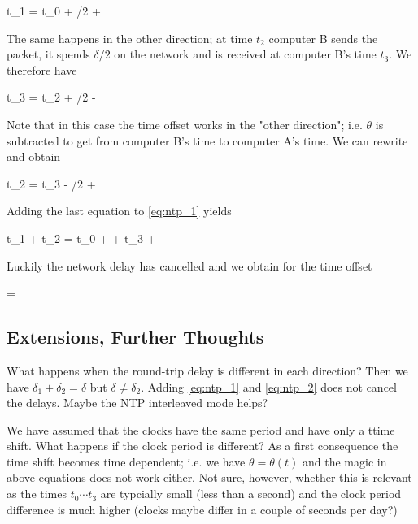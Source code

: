 \be\label{eq:ntp_1}
t_1 = t_0 + \delta/2 + \theta
\ee

The same happens in the other direction; at time $t_2$ computer B sends the packet, it spends $\delta/2$ on the network and is received at computer B's time $t_3$. We therefore have

\bee
t_3 = t_2 + \delta/2 - \theta
\eee

Note that in this case the time offset works in the "other direction"; i.e. $\theta$ is subtracted to get from computer B's time to computer A's time. We can rewrite and obtain

\be\label{eq:ntp_2}
t_2 = t_3 - \delta/2 + \theta
\ee

Adding the last equation to \eqref{eq:ntp_1} yields

\bee
t_1 + t_2 = t_0 + \theta + t_3 + \theta
\eee

Luckily the network delay has cancelled and we obtain for the time offset

\bee
\theta = 
\eee


\subsection{Extensions, Further Thoughts}

What happens when the round-trip delay is different in each direction? Then we have $\delta_1 + \delta_2 = \delta$ but $\delta \neq \delta_2$. Adding \eqref{eq:ntp_1} and \eqref{eq:ntp_2} does not cancel the delays. Maybe the NTP interleaved mode helps?

We have assumed that the clocks have the same period and have only a ttime shift. What happens if the clock period is different? As a first consequence the time shift becomes time dependent; i.e. we have $\theta = \theta(t)$ and the magic in above equations does not work either. Not sure, however, whether this is relevant as the times $t_0 \cdots t_3$ are typcially small (less than a second) and the clock period difference is much higher (clocks maybe differ in a couple of seconds per day?)



